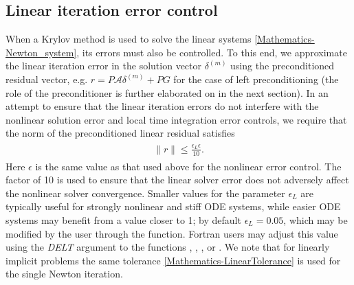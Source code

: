 \documentclass[letterpaper,10pt,english]{sphinxmanual}
\begin{document}
\subsection{Linear iteration error control}
\label{Mathematics:linear-iteration-error-control}\label{Mathematics:mathematics-error-linear}
When a Krylov method is used to solve the linear systems
\eqref{Mathematics-Newton_system}, its errors must also be controlled.  To this end,
we approximate the linear iteration error in the solution vector
\(\delta^{(m)}\) using the preconditioned residual vector,
e.g. \(r = P{\mathcal A}\delta^{(m)} + PG\) for the case of left
preconditioning (the role of the preconditioner is further elaborated
on in the next section).  In an attempt to ensure that the linear
iteration errors do not interfere with the nonlinear solution error
and local time integration error controls, we require that the norm of
the preconditioned linear residual satisfies
\label{Mathematics:equation-LinearTolerance}\begin{gather}
\begin{split}\|r\| \le \frac{\epsilon_L \epsilon}{10}.\end{split}\label{Mathematics-LinearTolerance}
\end{gather}
Here \(\epsilon\) is the same value as that used above for the
nonlinear error control.  The factor of 10 is used to ensure that the
linear solver error does not adversely affect the nonlinear solver
convergence.  Smaller values for the parameter \(\epsilon_L\) are
typically useful for strongly nonlinear and stiff ODE systems, while
easier ODE systems may benefit from a value closer to 1; by default
\(\epsilon_L = 0.05\), which may be modified by the user through
the {\hyperref[c_interface/User_callable:c.ARKSpilsSetEpsLin]{\emph{}}} function.  Fortran users may adjust
this value using the \emph{DELT} argument to the functions
{\hyperref[f_interface/Usage:f/_/FARKSPGMR]{\emph{}}}, {\hyperref[f_interface/Usage:f/_/FARKSPBCG]{\emph{}}}, {\hyperref[f_interface/Usage:f/_/FARKSPTFQMR]{\emph{}}},
{\hyperref[f_interface/Usage:f/_/FARKSPFGMR]{\emph{}}} or {\hyperref[f_interface/Usage:f/_/FARKPCG]{\emph{}}}.  We note that for
linearly implicit problems the same tolerance \eqref{Mathematics-LinearTolerance}
is used for the single Newton iteration.
\end{document}
